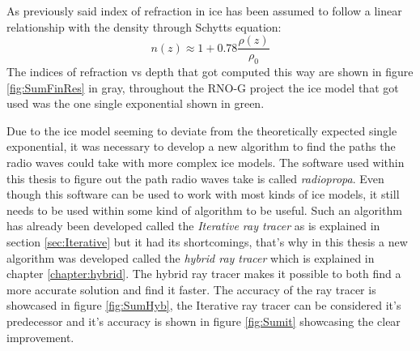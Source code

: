 As previously said index of refraction in ice has been assumed to follow a linear relationship with 
the density through Schytts equation:
\begin{equation*}
  n(z) \approx 1 + 0.78\frac{\rho(z)}{\rho_0}
\end{equation*}
The indices of refraction vs depth that got computed this way are shown in figure \ref{fig:SumFinRes}
in gray, throughout the RNO-G project the ice model that got used was the one single exponential shown in 
green.

Due to the ice model seeming to deviate from the theoretically expected single
exponential, it was necessary to develop a new algorithm to find the paths the
radio waves could take with more complex ice models.  The software used within
this thesis to figure out the path radio waves take is called
\textit{radiopropa}.  Even though this software can be used to work with most
kinds of ice models, it still needs to be used within some kind of algorithm to
be useful. Such an algorithm has already been developed called the
\textit{Iterative ray tracer} as is explained in section \ref{sec:Iterative}
but it had its shortcomings, that's why in this thesis a new algorithm was
developed called the \textit{hybrid ray tracer} which is explained in chapter
\ref{chapter:hybrid}. The hybrid ray tracer makes it possible to both find a
more accurate solution and find it faster. The accuracy of the ray tracer
is showcased in figure \ref{fig:SumHyb}, the Iterative ray tracer can
be considered it's predecessor and it's accuracy is shown in figure \ref{fig:Sumit}
showcasing the clear improvement.

